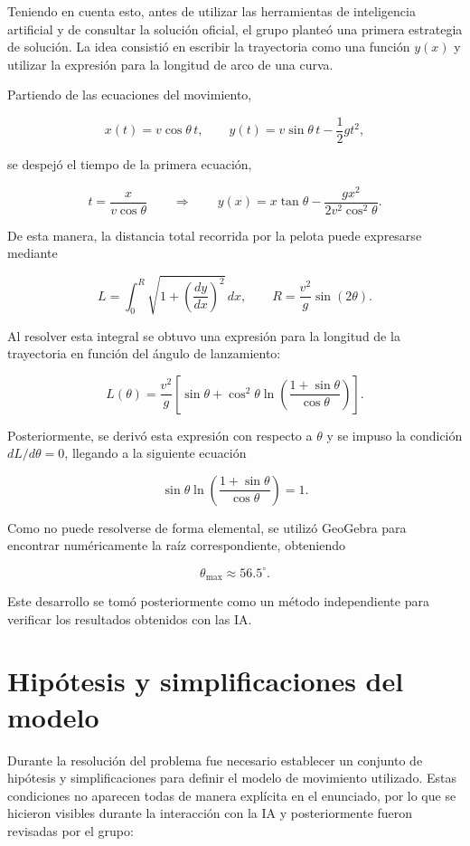 Teniendo en cuenta esto, antes de utilizar las herramientas de inteligencia artificial y de consultar la solución oficial, el grupo planteó una primera estrategia de solución. La idea consistió en escribir la trayectoria como una función \(y(x)\) y utilizar la expresión para la longitud de arco de una curva.

Partiendo de las ecuaciones del movimiento,

\[
x(t)=v\cos\theta\,t,
\qquad
y(t)=v\sin\theta\,t-\frac{1}{2}gt^2,
\]

se despejó el tiempo de la primera ecuación,

\[
t=\frac{x}{v\cos\theta} \qquad \Longrightarrow \qquad y(x)=x\tan\theta-\frac{gx^2}{2v^2\cos^2\theta}.
\]


De esta manera, la distancia total recorrida por la pelota puede expresarse mediante 

\[
L=\int_{0}^{R}\sqrt{1+\left(\frac{dy}{dx}\right)^2}\,dx, \qquad R=\frac{v^2}{g}\sin(2\theta).
\]


Al resolver esta integral se obtuvo una expresión para la longitud de la trayectoria en función del ángulo de lanzamiento:

\[
L(\theta)=
\frac{v^2}{g}
\left[
\sin\theta+
\cos^2\theta
\ln\left(
\frac{1+\sin\theta}{\cos\theta}
\right)
\right].
\]

Posteriormente, se derivó esta expresión con respecto a \(\theta\) y se impuso la condición $dL/d\theta=0$, llegando a la siguiente ecuación

\[
{
\sin\theta
\ln\left(
\frac{1+\sin\theta}{\cos\theta}
\right)=1
}.
\]

Como no puede resolverse de forma elemental, se utilizó GeoGebra para encontrar numéricamente la raíz correspondiente, obteniendo

\[
\theta_{\max}\approx56.5^\circ.
\]

Este desarrollo se tomó posteriormente como un método independiente para verificar los resultados obtenidos con las IA.

\section{Hipótesis y simplificaciones del modelo}

Durante la resolución del problema fue necesario establecer un conjunto de hipótesis y simplificaciones para definir el modelo de movimiento utilizado. Estas condiciones no aparecen todas de manera explícita en el enunciado, por lo que se hicieron visibles durante la interacción con la IA y posteriormente fueron revisadas por el grupo:

